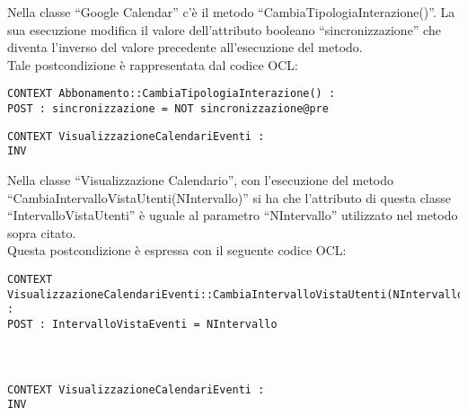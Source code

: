 \begin{listaPersonale}[OCL]{}
    Nella classe “Google Calendar” c’è il metodo “CambiaTipologiaInterazione()”. La sua esecuzione modifica il valore dell’attributo booleano “sincronizzazione” che diventa l’inverso del valore precedente all’esecuzione del metodo.\\
Tale postcondizione è rappresentata dal codice OCL:
    \begin{lstlisting}
CONTEXT Abbonamento::CambiaTipologiaInterazione() :
POST : sincronizzazione = NOT sincronizzazione@pre 
    \end{lstlisting}


    \begin{lstlisting}
CONTEXT VisualizzazioneCalendariEventi :
INV 
    \end{lstlisting}
    Nella classe “Visualizzazione Calendario”, con l’esecuzione del metodo “CambiaIntervalloVistaUtenti(NIntervallo)” si ha che l’attributo di questa classe “IntervalloVistaUtenti” è uguale al parametro “NIntervallo” utilizzato nel metodo sopra citato. \\ 
    Questa postcondizione è espressa con il seguente codice OCL:
    \begin{lstlisting}
CONTEXT VisualizzazioneCalendariEventi::CambiaIntervalloVistaUtenti(NIntervallo) :
POST : IntervalloVistaEventi = NIntervallo
    \end{lstlisting}
    \begin{lstlisting}
    \end{lstlisting}
    \begin{lstlisting}
    \end{lstlisting}
    \begin{lstlisting}
    \end{lstlisting}




    \begin{lstlisting}
CONTEXT VisualizzazioneCalendariEventi :
INV 
    \end{lstlisting}





\end{listaPersonale}
